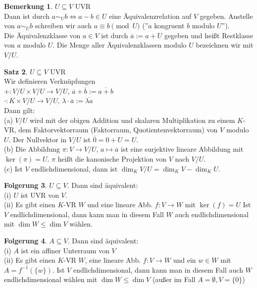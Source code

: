 \documentclass[10pt,a4paper,numbers=endperiod]{scrartcl}
\theoremstyle{definition}
\newtheorem{satz}{Satz}[section]
\newtheorem{bem}[satz]{Bemerkung}
\newtheorem{folg}[satz]{Folgerung}
\begin{document}
\begin{bem}
	$U \subseteq V$ UVR\\
	Dann ist durch $a \sim_U b \Leftrightarrow a-b \in U$ eine Äquivalenzrelation auf $V$ gegeben. Anstelle von $a \sim_U b$ schreiben wir auch $a \equiv b \pmod{U}$ (''$a$ kongruent $b$ modulo $U$'').\\
	Die Äquivalenzklasse von $a\in V$ ist durch $\overline{a}:= a +U$ gegeben und heißt Restklasse von $a$ modulo $U$. Die Menge aller Äquivalenzklassen modulo $U$ bezeichnen wir mit $V/U$.
\end{bem}

\begin{satz}
	$U \subseteq V$ UVR\\
	Wir definieren Verknüpfungen\\
	$+: V/U \times V/U \rightarrow V/U$, $\overline{a}+\overline{b} := \overline{a+b}$\\
	$\cdot: K \times V/U \rightarrow V/U$, $\lambda \cdot \overline{a} := \overline{\lambda a}$\\
	Dann gilt:\\
	(a) $V/U$ wird mit der obigen Addition und skalaren Multiplikation zu einem $K$-VR, dem Faktorvektorraum (Faktorraum, Quotientenvektorraum) von $V$ modulo $U$. Der Nullvektor in $V/U$ ist $\overline{0} = 0+U=U$.\\
	(b) Die Abbildung $\pi:V \rightarrow V/U$, $a \mapsto \overline{a}$ ist eine surjektive lineare Abbildung mit $\ker(\pi) = U$. $\pi$ heißt die kanonische Projektion von $V$ nach $V/U$.\\
	(c) Ist $V$ endlichdimensional, dann ist $\dim_K V/U = \dim_K V - \dim_K U$.
\end{satz}

\begin{folg}
	$U \subseteq V$. Dann sind äquivalent:\\
	(i) $U$ ist UVR von $V$.\\
	(ii) Es gibt einen $K$-VR $W$ und eine lineare Abb. $f:V \rightarrow W$ mit $\ker(f) = U$ Ist $V$ endlichdimensional, dann kann man in diesem Fall $W$ auch endlichdimensional mit $\dim W \leq \dim V$ wählen.
\end{folg}

\begin{folg}
	$A \subseteq V$. Dann sind äquivalent:\\
	(i) $A$ ist ein affiner Unterraum von $V$\\
	(ii) Es gibt einen $K$-VR $W$, eine lineare Abb. $f: V \rightarrow W$ und ein $w \in W$ mit $A=f^{-1}(\{w\})$. Ist $V$ endlichdimensional, dann kann man in diesem Fall auch $W$ endlichdimensional wählen mit $\dim W \leq \dim V$ (außer im Fall $A=\emptyset, V=\{0\}$)
\end{folg}
\end{document}
